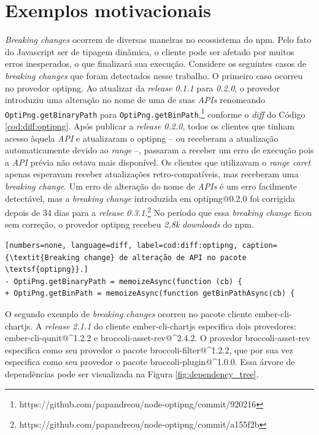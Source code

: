 \chapter{Exemplos motivacionais}
\label{cap:exemplos}

\textit{Breaking changes} ocorrem de diversas maneiras no ecossistema do \textsf{npm}. Pelo fato do \textsf{Javascript} ser de tipagem dinâmica, o cliente pode ser afetado por muitos erros inesperados, o que finalizará sua execução. Considere os seguintes casos de \textit{breaking changes} que foram detectados nesse trabalho. O primeiro caso ocorreu no provedor \textsf{optipng}. Ao atualizar da \textit{release 0.1.1} para \textit{0.2.0}, o provedor introduziu uma alteração no nome de uma de suas \textit{APIs} renomeando \texttt{OptiPng.getBinaryPath} para \texttt{OptiPng.getBinPath},\footnote{https://github.com/papandreou/node-optipng/commit/920216} conforme o \textit{diff} do Código \ref{cod:diff:optipng}. Após publicar a \textit{release 0.2.0}, todos os clientes que tinham acesso àquela \textit{API} e atualizaram o \textsf{optipng} -- ou receberam a atualização automaticamente devido ao \textit{range} --, passaram a receber um erro de execução pois a \textit{API} prévia não estava mais disponível. Os clientes que utilizavam o \textit{range caret} apenas esperavam receber atualizações retro-compatíveis, mas receberam uma \textit{breaking change}. Um erro de alteração do nome de \textit{APIs} é um erro facilmente detectável, mas a \textit{breaking change} introduzida em \textsf{optipng@0.2.0} foi corrigida depois de 34 dias para a \textit{release 0.3.1}.\footnote{https://github.com/papandreou/node-optipng/commit/a155f2b} No período que essa \textit{breaking change} ficou sem correção, o provedor \textsf{optipng} recebeu \textit{2,8k} \textit{downloads} do \textsf{npm}.

\begin{lstlisting}[numbers=none, language=diff, label=cod:diff:optipng, caption={\textit{Breaking change} de alteração de API no pacote \textsf{optipng}}.]
- OptiPng.getBinaryPath = memoizeAsync(function (cb) {
+ OptiPng.getBinPath = memoizeAsync(function getBinPathAsync(cb) {
\end{lstlisting}

O segundo exemplo de \textit{breaking changes} ocorreu no pacote cliente \textsf{ember-cli-chartjs}. A \textit{release 2.1.1} do cliente \textsf{ember-cli-chartjs} especifica dois provedores: \textsf{ember-cli-qunit@\textasciicircum1.2.2} e \textsf{broccoli-asset-rev@\textasciicircum2.4.2}. O provedor \textsf{broccoli-asset-rev} especifica como seu provedor o pacote \textsf{broccoli-filter@\textasciicircum1.2.2}, que por sua vez especifica como seu provedor o pacote \textsf{broccoli-plugin@\textasciicircum1.0.0}. Essa árvore de dependências pode ser visualizada na Figura \ref{fig:dependency_tree}.

